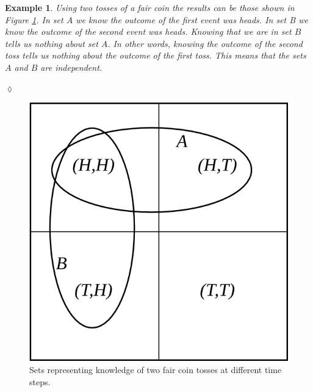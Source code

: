 \documentclass[lecture,12pt,]{pcms-l}
\theoremstyle{example}
\newtheorem{example}{Example}[section]
\begin{document}
\begin{example}
Using two tosses of a fair coin the results can be those shown in Figure \ref{fig:03coinProb}. In set $A$ we know the outcome of the first event was heads. In set B we know the outcome of the second event was heads. Knowing that we are in set $B$ tells us nothing about set $A$. In other words, knowing the outcome of the second toss tells us nothing about the outcome of the first toss. This means that the sets $A$ and $B$ are independent.
\end{example}
$\lozenge$
\begin{figure}[ht!]
	\centering
	\includegraphics[width=.3\textwidth]{images/03coinProb}
	\caption{Sets representing knowledge of two fair coin tosses at different time steps.}
	\label{fig:03coinProb}
\end{figure}
\end{document}
